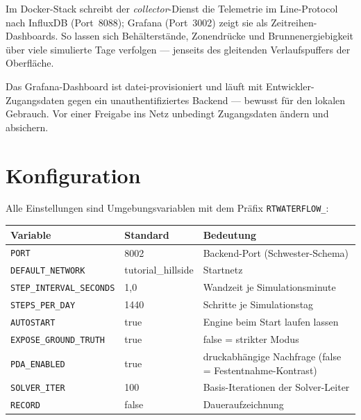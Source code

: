 \documentclass[11pt,a4paper,parskip=half]{scrreprt}
\begin{document}
Im Docker-Stack schreibt der \emph{collector}-Dienst die Telemetrie im
Line-Protocol nach InfluxDB (Port~8088); Grafana (Port~3002) zeigt sie als
Zeitreihen-Dashboards. So lassen sich Behälterstände, Zonendrücke und
Brunnenergiebigkeit über viele simulierte Tage verfolgen — jenseits des
gleitenden Verlaufspuffers der Oberfläche.

\begin{beispiel}[Zugangsdaten]
Das Grafana-Dashboard ist datei-provisioniert und läuft mit Entwickler-Zugangsdaten
gegen ein unauthentifiziertes Backend — bewusst für den lokalen Gebrauch. Vor einer
Freigabe ins Netz unbedingt Zugangsdaten ändern und absichern.
\end{beispiel}

\chapter{Konfiguration}
\label{ch:konfiguration}

Alle Einstellungen sind Umgebungsvariablen mit dem Präfix \texttt{RTWATERFLOW\_}:

\begin{center}
\small
\begin{tabularx}{\linewidth}{@{}llX@{}}
\toprule
Variable & Standard & Bedeutung \\
\midrule
\texttt{PORT} & 8002 & Backend-Port (Schwester-Schema) \\
\texttt{DEFAULT\_NETWORK} & tutorial\_hillside & Startnetz \\
\texttt{STEP\_INTERVAL\_SECONDS} & 1{,}0 & Wandzeit je Simulationsminute \\
\texttt{STEPS\_PER\_DAY} & 1440 & Schritte je Simulationstag \\
\texttt{AUTOSTART} & true & Engine beim Start laufen lassen \\
\texttt{EXPOSE\_GROUND\_TRUTH} & true & false = strikter Modus \\
\texttt{PDA\_ENABLED} & true & druckabhängige Nachfrage (false = Festentnahme-Kontrast) \\
\texttt{SOLVER\_ITER} & 100 & Basis-Iterationen der Solver-Leiter \\
\texttt{RECORD} & false & Daueraufzeichnung \\
\bottomrule
\end{tabularx}
\end{center}

\end{document}
